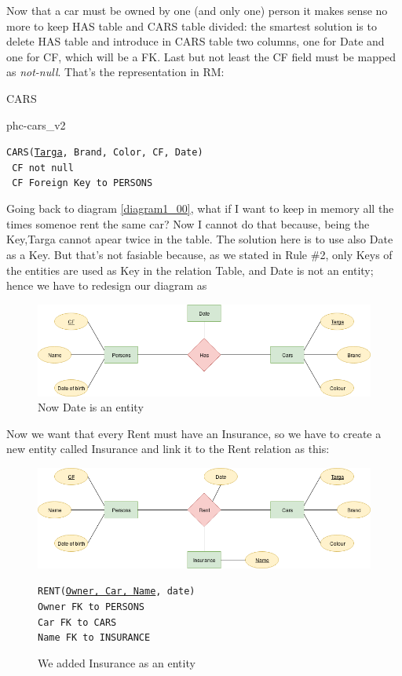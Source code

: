 \documentclass[class=book, crop=false, oneside]{standalone}
\begin{document}
Now that a car must be owned by one (and only one) person it makes sense no more to keep HAS table and CARS table divided: the smartest solution is to delete HAS table and introduce in CARS table two columns, one for Date and one for CF, which will be a FK. Last but not least the CF field must be mapped as \emph{not-null}.
That's the representation in RM:
\vskip 20pt
\begin{minipage}{.8\textwidth}
	CARS
	\begin{table}[H]
		{phc-cars_v2}
	\end{table}
	\texttt{CARS(\underline{Targa}, Brand, Color, CF, Date)}\\
	\texttt{	CF not null}\\
	\texttt{	CF Foreign Key to PERSONS}
\end{minipage}
\vskip 20pt

Going back to diagram \ref{diagram1_00}, what if I want to keep in memory all the times somenoe rent the same car?
Now I cannot do that because, being the Key,Targa cannot apear twice in the table.
The solution here is to use also Date as a Key.
But that's not fasiable because, as we stated in Rule \#2, only Keys of the entities are used as Key in the relation Table, and Date is not an entity; hence we have to redesign our diagram as
\begin{figure}[H]
	\includegraphics[width=\textwidth,keepaspectratio]{diagram1_03.png}
	\caption{Now Date is an entity}
	\label{diagram1_03}
\end{figure}
\vskip 20pt

Now we want that every Rent must have an Insurance, so we have to create a new entity called Insurance and link it to the Rent relation as this:
\begin{figure}[H]
	\includegraphics[width=\textwidth,keepaspectratio]{diagram1_04.png}
	\caption{We added Insurance as an entity}
	\texttt{RENT(\underline{Owner, Car, Name}, date)}\\
		\texttt{Owner FK to PERSONS}\\
		\texttt{Car FK to CARS}\\
		\texttt{Name FK to INSURANCE}
	\label{diagram1_04}
\end{figure}
\vskip 20pt
\end{document}
